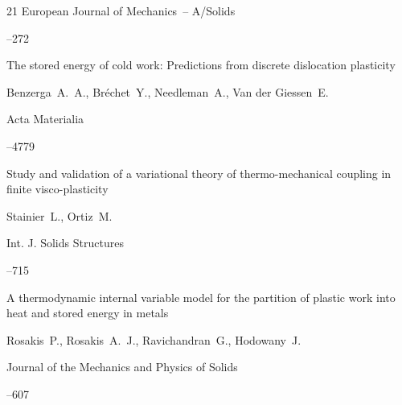 \begin{thebibliography}{21}
\jour European Journal of Mechanics~-- A/Solids




--272





\paper The stored energy of cold work: Predictions from discrete dislocation plasticity

\by  Benzerga~A.~A., Br\'echet~Y., Needleman~A., Van der Giessen~E.

\jour Acta Materialia




--4779





\paper Study and validation of a variational theory of thermo-mechanical coupling in finite visco-plasticity

\by Stainier~L., Ortiz~M.

\jour Int. J. Solids Structures




--715





\paper A thermodynamic internal variable model for the partition of plastic work into heat and stored energy in metals

\by Rosakis~P., Rosakis~A.~J., Ravichandran~G., Hodowany~J.

\jour Journal of the Mechanics and Physics of Solids




--607





\end{thebibliography}
